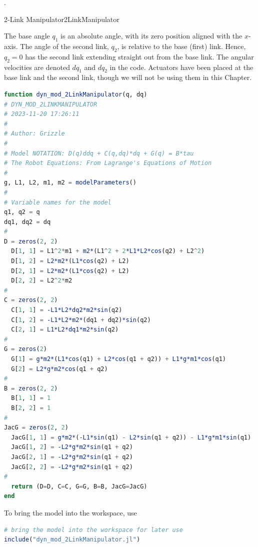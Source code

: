 \Qed.

\bigskip

\begin{factColor}{2-Link Manipulator}{2LinkManipulator}

The base angle $q_1$ is an absolute angle, with its zero position aligned with the $x$-axis. The angle of the second link, $q_2$, is relative to the base (first) link. Hence, $q_2=0$ has the second link extending straight out from the base link. The angular velocities are denoted $dq_1$ and $dq_2$ in the code. Actuators have been placed at the base link and the second link, though we will not be using them in this Chapter. \\

\begin{lstlisting}[language=Julia,style=mystyle]
function dyn_mod_2LinkManipulator(q, dq)
# DYN_MOD_2LINKMANIPULATOR
# 2023-11-20 17:26:11
#
# Author: Grizzle
#
# Model NOTATION: D(q)ddq + C(q,dq)*dq + G(q) = B*tau 
# The Robot Equations: From Lagrange's Equations of Motion
#
g, L1, L2, m1, m2 = modelParameters()
#
# Variable names for the model
q1, q2 = q 
dq1, dq2 = dq
#
D = zeros(2, 2)
  D[1, 1] = L1^2*m1 + m2*(L1^2 + 2*L1*L2*cos(q2) + L2^2)
  D[1, 2] = L2*m2*(L1*cos(q2) + L2)
  D[2, 1] = L2*m2*(L1*cos(q2) + L2)
  D[2, 2] = L2^2*m2
#
C = zeros(2, 2)
  C[1, 1] = -L1*L2*dq2*m2*sin(q2)
  C[1, 2] = -L1*L2*m2*(dq1 + dq2)*sin(q2)
  C[2, 1] = L1*L2*dq1*m2*sin(q2)
#
G = zeros(2)
  G[1] = g*m2*(L1*cos(q1) + L2*cos(q1 + q2)) + L1*g*m1*cos(q1)
  G[2] = L2*g*m2*cos(q1 + q2)
#
B = zeros(2, 2)
  B[1, 1] = 1
  B[2, 2] = 1
#
JacG = zeros(2, 2)
  JacG[1, 1] = g*m2*(-L1*sin(q1) - L2*sin(q1 + q2)) - L1*g*m1*sin(q1)
  JacG[1, 2] = -L2*g*m2*sin(q1 + q2)
  JacG[2, 1] = -L2*g*m2*sin(q1 + q2)
  JacG[2, 2] = -L2*g*m2*sin(q1 + q2)
#
  return (D=D, C=C, G=G, B=B, JacG=JacG)
end
\end{lstlisting}

To bring the model into the workspace, use 

\begin{lstlisting}[language=Julia,style=mystyle]
# bring the model into the workspace for later use
include("dyn_mod_2LinkManipulator.jl") 
\end{lstlisting}    
\end{factColor}

\bigskip

